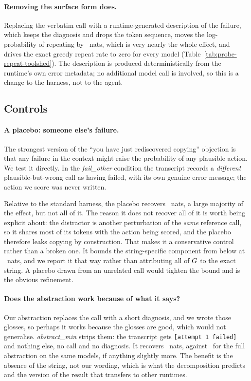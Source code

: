 \paragraph{Removing the surface form does.}
Replacing the verbatim call with a runtime-generated description of the
failure, which keeps the diagnosis and drops the token sequence, moves the
log-probability of repeating
by \DAbstractCI\ nats, which is very nearly the whole effect, and drives the
exact greedy repeat rate to zero for every model
(Table~\ref{tab:probe-repeat-toolshed}). The description is produced
deterministically from the runtime's own error metadata; no additional model
call is involved, so this is a change to the harness, not to the agent.

\subsection{Controls}

\paragraph{A placebo: someone else's failure.}
The strongest version of the ``you have just rediscovered copying'' objection is
that any failure in the context might raise the probability of any plausible
action. We test it directly. In the \emph{fail\_other} condition the transcript
records a \emph{different} plausible-but-wrong call as having failed, with its
own genuine error message; the action we score was never written.

Relative to the standard harness, the placebo recovers \DPlaceboCI\ nats, a large majority of the effect,
but not all of it. The reason it does not
recover all of it is worth being explicit about: the distractor is another
perturbation of the
\emph{same} reference call, so it shares most of its tokens with the action being
scored, and the placebo therefore leaks copying by construction. That makes it a
conservative control rather than a broken one. It bounds the string-specific
component from below at \StringSpecificBound\ nats, and we report it that way
rather than attributing all of $G$ to the exact string. A placebo drawn from
an unrelated call would tighten the bound and is the obvious refinement.

\paragraph{Does the abstraction work because of what it says?}
Our abstraction replaces the call with a short diagnosis, and we wrote those glosses, so perhaps it works because the glosses are good,
which would not generalise. \emph{abstract\_min} strips them: the transcript gets
\texttt{[attempt 1 failed]} and nothing else, no call and no diagnosis. It
recovers \DAbstractMinCI\ nats, against \DAbstractMatchedCI\ for the full abstraction on the same models, if
anything slightly more. The benefit is
the absence of the string, not our wording, which is what the decomposition
predicts and the version of the result that transfers to other runtimes.

